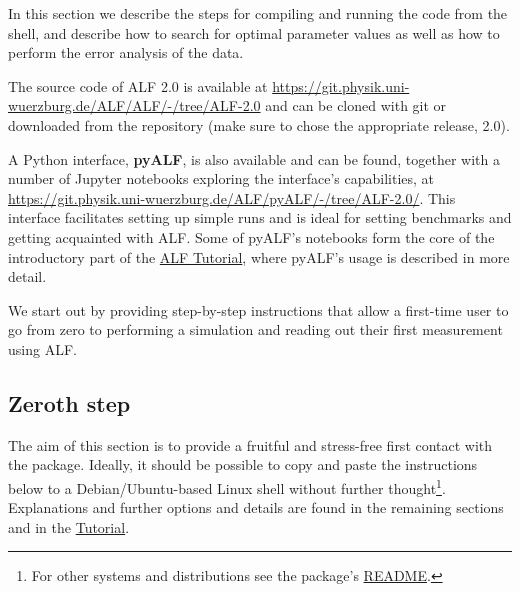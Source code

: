 


In this section we describe the steps for compiling and running the code from the shell, and describe how to search for optimal parameter values as well as how to perform the error analysis of the data.

The source code of ALF 2.0 is available at \url{https://git.physik.uni-wuerzburg.de/ALF/ALF/-/tree/ALF-2.0} and can be cloned with git or downloaded from the repository (make sure to chose the appropriate release, 2.0).

A Python interface, \textbf{pyALF}, is also available and can be found, together with a number of Jupyter notebooks exploring the interface's capabilities, at \url{https://git.physik.uni-wuerzburg.de/ALF/pyALF/-/tree/ALF-2.0/}. This interface facilitates setting up simple runs and is ideal for setting benchmarks and getting acquainted with ALF. Some of pyALF's notebooks form the core of the introductory part of the \href{https://git.physik.uni-wuerzburg.de/ALF/ALF_Tutorial}{ALF Tutorial}, where pyALF's usage is described in more detail.

We start out by providing step-by-step instructions that allow a first-time user to go from zero to performing a simulation and reading out their first measurement using ALF.

\subsection{Zeroth step}
\label{sec:zeroth}

The aim of this section is to provide a fruitful and stress-free first contact with the package. Ideally, it should be possible to copy and paste the instructions below to a Debian/Ubuntu-based Linux shell without further thought\footnote{For other systems and distributions see the package's  \href{https://git.physik.uni-wuerzburg.de/ALF/ALF/-/blob/ALF-2.0/README.md}{README}.}. Explanations and further options and details are found in the remaining sections and in the \href{https://git.physik.uni-wuerzburg.de/ALF/ALF_Tutorial}{Tutorial}.

